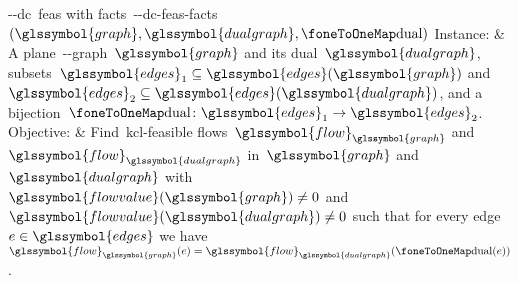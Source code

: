 \begin{problem}[framed]{\source-\sink-\gls{dc}~\acrlong{feas} with
\gls{facts}~\source-\sink-\gls{dc}-\gls{feas}-\gls{facts}$(\glssymbol{graph},
\glssymbol{dualgraph},\oneToOneMap)$}%
  Instance: & A plane~\source-\sink-graph~$\glssymbol{graph}$ and its
  dual~$\glssymbol{dualgraph}$,
  subsets~$\glssymbol{edges}_1\subseteq\glssymbol{edges}(\glssymbol{graph})$
  and~$\glssymbol{edges}_2\subseteq\glssymbol{edges} (\glssymbol{dualgraph})$,
  and a bijection~$\oneToOneMap\colon
  \glssymbol{edges}_1 \to \glssymbol{edges}_2$.\\
  Objective: & Find~\gls{kcl}-feasible flows~$\glssymbol{flow}_{\glssymbol{graph}}$
  and~$\glssymbol{flow}_{\glssymbol{dualgraph}}$ in~$\glssymbol{graph}$
  and~$\glssymbol{dualgraph}$
  with~$\glssymbol{flowvalue}(\glssymbol{graph})\not=0$ and~$
  \glssymbol{flowvalue}(\glssymbol{dualgraph})\not=0$ such that
  for every edge~$\edge\in\glssymbol{edges}$ we
  have~$\glssymbol{flow}_{\glssymbol{graph}}(\edge) =
  \glssymbol{flow}_{\glssymbol{dualgraph}}(\oneToOneMap(\edge))$.
\end{problem}%
